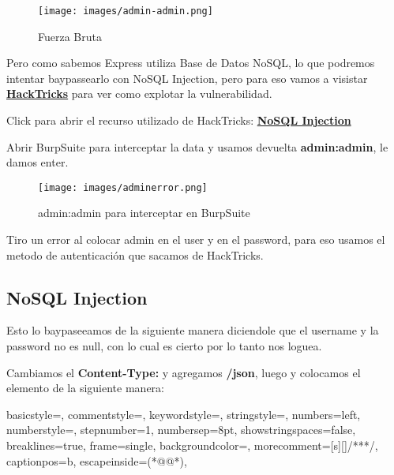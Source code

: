 \documentclass[a4paper]{article} %
\begin{document}
    \begin{figure}[h] %
        \centering
        \texttt{[image: images/admin-admin.png]}
        \caption{Fuerza Bruta} %
    \end{figure}\par

    Pero como sabemos Express utiliza Base de Datos NoSQL, lo que podremos intentar baypassearlo con NoSQL Injection, pero para eso vamos a visistar \href{https://book.hacktricks.xyz/welcome/readme}{\textbf{\color{red}HackTricks}} para ver como explotar la vulnerabilidad.

    Click para abrir el recurso utilizado de HackTricks: \href{https://book.hacktricks.xyz/pentesting-web/nosql-injection}{\textbf{\color{orange}NoSQL Injection}}

    Abrir BurpSuite para interceptar la data y usamos devuelta \textbf{admin:admin}, le damos enter.

    \begin{figure}[h] %
        \centering
        \texttt{[image: images/adminerror.png]}
        \caption{admin:admin para interceptar en BurpSuite} %
    \end{figure}\par\vspace{5cm}

    Tiro un error al colocar admin en el user y en el password, para eso usamos el metodo de autenticación que sacamos de HackTricks.

    \subsection{NoSQL Injection}
    Esto lo baypaseeamos de la siguiente manera diciendole que el username y la password no es null, con lo cual es cierto por lo tanto nos loguea.

    Cambiamos el \textbf{Content-Type:} y agregamos \textbf{/json}, luego y colocamos el elemento de la siguiente manera:

    
{
  basicstyle=\footnotesize\ttfamily,
  commentstyle=\color{gray},
  keywordstyle=\color{blue},
  stringstyle=\color{jsonpurple},
  numbers=left,
  numberstyle=\tiny\color{gray},
  stepnumber=1,
  numbersep=8pt,
  showstringspaces=false,
  breaklines=true,
  frame=single,
  backgroundcolor=\color{white},
  morecomment=[s][\color{orange}]{/**}{*/},
  captionpos=b,
  escapeinside={(*@}{@*)},
}
\end{document}
